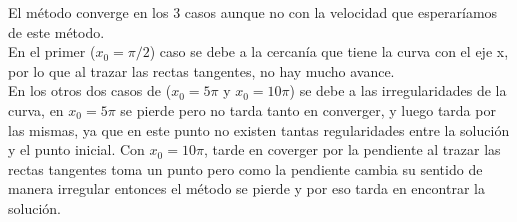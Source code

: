 El método converge en los 3 casos aunque no con la velocidad que esperaríamos de este método. \\
En el primer ($x_{0} = \pi/2$) caso se debe a la cercanía que tiene la curva con el eje x, por lo que al trazar
las rectas tangentes, no hay mucho avance. \\
En los otros dos casos de ($x_{0} = 5\pi$ y $x_{0} = 10\pi$) se debe a las irregularidades de la curva,
en $x_{0} = 5\pi$ se pierde pero no tarda tanto en converger, y luego tarda por las mismas, ya que en este punto no existen tantas regularidades
entre la solución y el punto inicial.
Con $x_{0} = 10\pi$, tarde en coverger por la pendiente al trazar las rectas tangentes toma un punto pero como la 
pendiente cambia su sentido de manera irregular entonces el método se pierde y por eso tarda en encontrar la solución.

